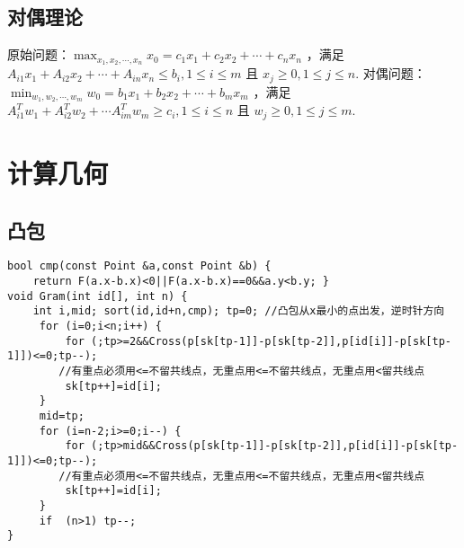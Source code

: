 \documentclass[landscape,a4paper]{article}
\begin{document}
\subsection{对偶理论}

 原始问题：$\max_{x_1, x_2, \cdots, x_n} x_0 = c_1x_1 + c_2x_2 + \cdots + c_nx_n$ ，满足 $A_{i1}x_1 + A_{i2}x_2 + \cdots + A_{in}x_n \leq b_i, 1 \leq i \leq m$ 且 $x_j \geq 0, 1 \leq j \leq n$.
 对偶问题：$\min_{w_1, w_2, \cdots, w_m} w_0 = b_1x_1 + b_2x_2 + \cdots + b_mx_m$ ，满足 $A^T_{i1}w_1 + A^T_{i2}w_2 + \cdots A^T_{im}w_m \geq c_i, 1 \leq i \leq n$ 且 $w_j \geq 0, 1 \leq j \leq m$.

\section{计算几何}

\subsection{凸包}
\begin{lstlisting}
bool cmp(const Point &a,const Point &b) {
	return F(a.x-b.x)<0||F(a.x-b.x)==0&&a.y<b.y; }
void Gram(int id[], int n) {
	int i,mid; sort(id,id+n,cmp); tp=0; //凸包从x最小的点出发，逆时针方向
     for (i=0;i<n;i++) {
         for (;tp>=2&&Cross(p[sk[tp-1]]-p[sk[tp-2]],p[id[i]]-p[sk[tp-1]])<=0;tp--); 
		//有重点必须用<=不留共线点，无重点用<=不留共线点，无重点用<留共线点
         sk[tp++]=id[i];
     }
     mid=tp;
     for (i=n-2;i>=0;i--) {
         for (;tp>mid&&Cross(p[sk[tp-1]]-p[sk[tp-2]],p[id[i]]-p[sk[tp-1]])<=0;tp--); 
		//有重点必须用<=不留共线点，无重点用<=不留共线点，无重点用<留共线点
         sk[tp++]=id[i];
     }
     if  (n>1) tp--;
}
\end{lstlisting}
\end{document}

